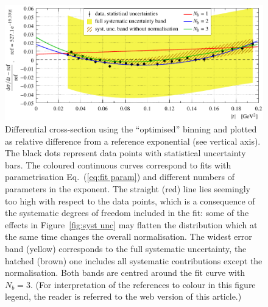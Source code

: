 \begin{figure}
\vskip-5mm
\begin{center}
\includegraphics{fig/t_dist_rel_with_fits.pdf}
\vskip-4mm
\caption{%
Differential cross-section using the ``optimised'' binning and plotted as relative difference from a reference exponential (see vertical axis). The black dots represent data points with statistical uncertainty bars. The coloured continuous curves correspond to fits with parametrisation Eq.~(\ref{eq:fit param}) and different numbers of parameters in the exponent. The straight (red) line lies seemingly too high with respect to the data points, which is a consequence of the systematic degrees of freedom included in the fit: some of the effects in Figure~\ref{fig:syst unc} may flatten the distribution which at the same time changes the overall normalisation. The widest error band (yellow) corresponds to the full systematic uncertainty, the hatched (brown) one includes all systematic contributions except the normalisation. Both bands are centred around the fit curve with $N_b = 3$. (For interpretation of the references to colour in this figure legend, the reader is referred to the web version of this article.)
}
\label{fig:data rel ob}
\end{center}
\vskip-2mm
\end{figure}



